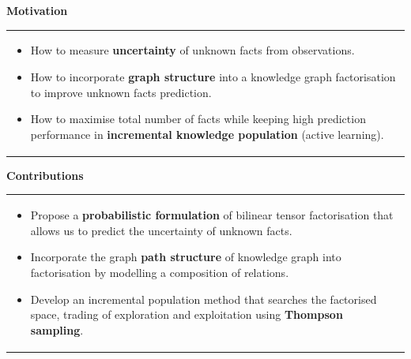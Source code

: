 \documentclass[a0,landscape]{a0poster}
\newcommand{\itemup}{\vspace{-.5cm}}
\begin{document}
\begin{multicols}{3}
\small

\color{DarkSlateGray}

\noindent\textbf{\Large Motivation}

\vspace{.2cm}

\begin{tabular}{p{\linewidth}}
\cellcolor{DarkSlateGray}
\color{white}
\begin{itemize}
\itemup
\item How to measure \textbf{uncertainty} of unknown facts from observations.
\item How to incorporate \textbf{graph structure} into a knowledge graph factorisation to improve  unknown facts prediction.
\item How to maximise total number of facts while keeping high prediction performance in \textbf{incremental knowledge population} (active learning).
\itemup
\end{itemize}
\end{tabular}

\vspace{.5cm}

\noindent\textbf{\Large Contributions}

\vspace{.2cm}

\begin{tabular}{p{\linewidth}}
\cellcolor{DarkSlateGray}
\color{white}
\begin{itemize}
\itemup
\item Propose a \textbf{probabilistic formulation} of bilinear tensor factorisation that allows us to predict the uncertainty of unknown facts.
\item Incorporate the graph \textbf{path structure} of knowledge graph into factorisation by modelling a composition of relations.
\item Develop an incremental population method that searches the factorised space, trading of exploration and exploitation using \textbf{Thompson sampling}.
\itemup
\end{itemize}
\end{tabular}



\color{Black}



\end{multicols}
\end{document}
